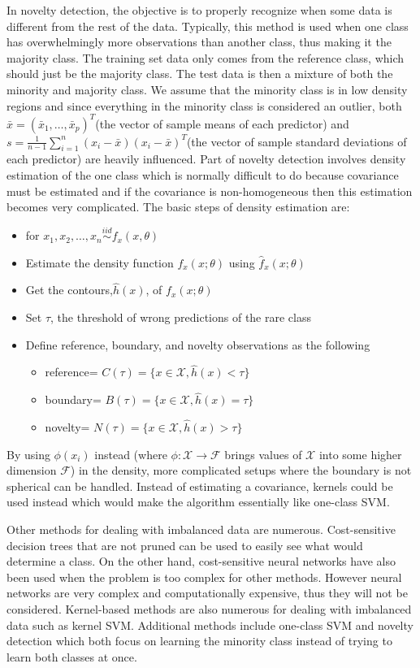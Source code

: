 \documentclass[a4paper]{article}
\begin{document}
In novelty detection, the objective is to properly recognize when some data is different from the rest of the data. Typically, this method is used when one class has overwhelmingly more observations than another class, thus making it the majority class. The training set data only comes from the reference class, which should just be the majority class. The test data is then a mixture of both the minority and majority class. We assume that the minority class is in low density regions and since everything in the minority class is considered an outlier, both $\bar{x}=(\bar{x}_1,\dots,\bar{x}_p)^T$(the vector of sample means of each predictor) and $s=\frac{1}{n-1}\sum^n_{i=1}(x_i-\bar{x})(x_i-\bar{x})^T$(the vector of sample standard deviations of each predictor) are heavily influenced. Part of novelty detection involves density estimation of the one class which is normally difficult to do because covariance must be estimated and if the covariance is non-homogeneous then this estimation becomes very complicated. The basic steps of density estimation are:
\begin{itemize}
\item for $x_1,x_2,\dots,x_n\stackrel{iid}{\sim}f_x(x,\theta)$
\item Estimate the density function $f_x(x;\theta)$ using $\hat{f}_x(x;\theta)$
\item Get the contours,$\hat{h}(x)$, of $f_x(x;\theta)$
\item Set $\tau$, the threshold of wrong predictions of the rare class
\item Define reference, boundary, and novelty observations as the following
\begin{itemize}
\item reference= $C(\tau)=\{x\in\mathcal{X}, \hat{h}(x)<\tau\}$
\item boundary= $B(\tau)=\{x\in\mathcal{X}, \hat{h}(x)=\tau\}$
\item novelty= $N(\tau)=\{x\in\mathcal{X}, \hat{h}(x)>\tau\}$
\end{itemize}
\end{itemize}

By using $\phi(x_i)$ instead (where $\phi:\mathcal{X}\rightarrow\mathcal{F}$ brings values of $\mathcal{X}$ into some higher dimension $\mathcal{F}$) in the density, more complicated setups where the boundary is not spherical can be handled. Instead of estimating a covariance, kernels could be used instead which would make the algorithm essentially like one-class SVM. 

 	Other methods for dealing with imbalanced data are numerous. Cost-sensitive decision trees that are not pruned can be used to easily see what would determine a class. On the other hand, cost-sensitive neural networks have also been used when the problem is too complex for other methods. However neural networks are very complex and computationally expensive, thus they will not be considered. Kernel-based methods are also numerous for dealing with imbalanced data such as kernel SVM. Additional methods include one-class SVM and novelty detection which both focus on learning the minority class instead of trying to learn both classes at once.%
\end{document}
